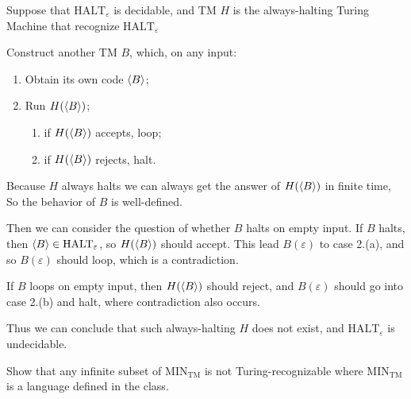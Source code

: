 \documentclass{homework}
\begin{document}
\begin{solution}
  Suppose that $\mathrm{HALT}_{\varepsilon}$ is decidable, and TM $H$ is the always-halting Turing Machine that recognize $\mathrm{HALT}_{\varepsilon}$
  
  Construct another TM $B$, which, on any input:
  \begin{enumerate}
    \item Obtain its own code $\langle B \rangle$;
    \item Run $H(\langle B \rangle)$;
    \begin{enumerate}
      \item if $H(\langle B \rangle)$ accepts, loop;
      \item if $H(\langle B \rangle)$ rejects, halt.
    \end{enumerate}
  \end{enumerate}
  Because $H$ always halts we can always get the answer of $H(\langle B \rangle)$ in finite time, So the behavior of $B$ is well-defined.

  Then we can consider the question of whether $B$ halts on empty input. If $B$ halts, then $\langle B \rangle\in\mathrm{HALT}_{\varepsilon}$, so $H(\langle B \rangle)$ should accept. This lead $B(\varepsilon)$ to case 2.(a), and so $B(\varepsilon)$ should loop, which is a contradiction. 
  
  If $B$ loops on empty input, then $H(\langle B \rangle)$ should reject, and $B(\varepsilon)$ should go into case 2.(b) and halt, where contradiction also occurs.
  
  Thus we can conclude that such always-halting $H$ does not exist, and $\mathrm{HALT}_{\varepsilon}$ is undecidable.
\end{solution}

\begin{problem}
  Show that any infinite subset of $\mathrm{MIN}_{\text{TM}}$ is not
  Turing-recognizable where $\mathrm{MIN}_{\text{TM}}$ is a language defined in
  the class.
\end{problem}
\end{document}
